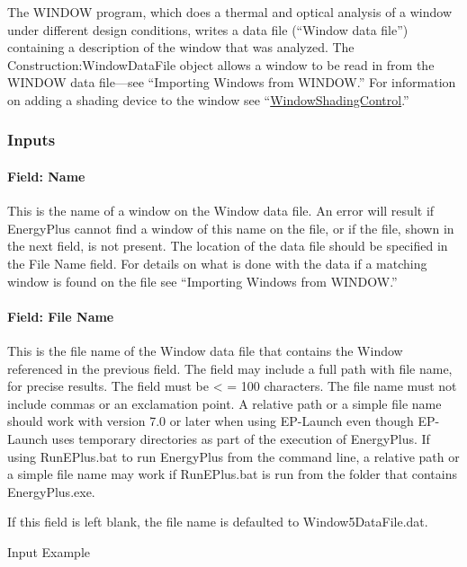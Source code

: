 The WINDOW program, which does a thermal and optical analysis of a window under different design conditions, writes a data file (``Window data file'') containing a description of the window that was analyzed. The Construction:WindowDataFile object allows a window to be read in from the WINDOW data file---see ``Importing Windows from WINDOW.'' For information on adding a shading device to the window see ``\hyperref[windowpropertyshadingcontrol]{WindowShadingControl}.''

\subsubsection{Inputs}\label{inputs-42}

\paragraph{Field: Name}\label{field-name-36}

This is the name of a window on the Window data file. An error will result if EnergyPlus cannot find a window of this name on the file, or if the file, shown in the next field, is not present. The location of the data file should be specified in the File Name field. For details on what is done with the data if a matching window is found on the file see ``Importing Windows from WINDOW.''

\paragraph{Field: File Name}\label{field-file-name-000}

This is the file name of the Window data file that contains the Window referenced in the previous field. The field may include a full path with file name, for precise results. The field must be \textless{} = 100 characters. The file name must not include commas or an exclamation point. A relative path or a simple file name should work with version 7.0 or later when using EP-Launch even though EP-Launch uses temporary directories as part of the execution of EnergyPlus. If using RunEPlus.bat to run EnergyPlus from the command line, a relative path or a simple file name may work if RunEPlus.bat is run from the folder that contains EnergyPlus.exe.

If this field is left blank, the file name is defaulted to Window5DataFile.dat.

Input Example

